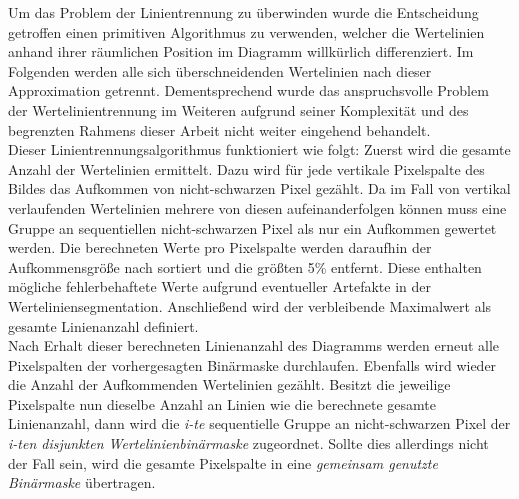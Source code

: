 Um das Problem der Linientrennung zu überwinden wurde die Entscheidung getroffen einen primitiven Algorithmus zu verwenden, welcher die Wertelinien anhand ihrer räumlichen Position im Diagramm willkürlich differenziert. Im Folgenden werden alle sich überschneidenden Wertelinien nach dieser Approximation getrennt. Dementsprechend wurde das anspruchsvolle Problem der Wertelinientrennung im Weiteren aufgrund seiner Komplexität und des begrenzten Rahmens dieser Arbeit nicht weiter eingehend behandelt.
\\
Dieser Linientrennungsalgorithmus funktioniert wie folgt: Zuerst wird die gesamte Anzahl der Wertelinien ermittelt. Dazu wird für jede vertikale Pixelspalte des Bildes das Aufkommen von nicht-schwarzen Pixel gezählt. Da im Fall von vertikal verlaufenden Wertelinien mehrere von diesen aufeinanderfolgen können muss eine Gruppe an sequentiellen nicht-schwarzen Pixel als nur ein Aufkommen gewertet werden. Die berechneten Werte pro Pixelspalte werden daraufhin der Aufkommensgröße nach sortiert und die größten 5\% entfernt. Diese enthalten mögliche fehlerbehaftete Werte aufgrund eventueller Artefakte in der Werteliniensegmentation. Anschließend wird der verbleibende Maximalwert als gesamte Linienanzahl definiert.
\\
Nach Erhalt dieser berechneten Linienanzahl des Diagramms werden erneut alle Pixelspalten der vorhergesagten Binärmaske durchlaufen. Ebenfalls wird wieder die Anzahl der Aufkommenden Wertelinien gezählt. Besitzt die jeweilige Pixelspalte nun dieselbe Anzahl an Linien wie die berechnete gesamte Linienanzahl, dann wird die \emph{i-te} sequentielle Gruppe an nicht-schwarzen Pixel der \emph{i-ten disjunkten Wertelinienbinärmaske} zugeordnet. Sollte dies allerdings nicht der Fall sein, wird die gesamte Pixelspalte in eine \emph{gemeinsam genutzte Binärmaske} übertragen.

